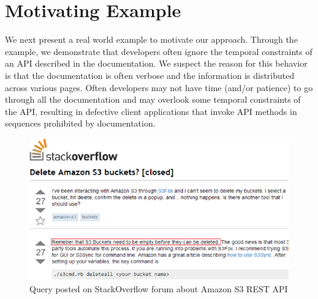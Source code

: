 \section{Motivating Example}
\label{sec:example}

We next present a real world example to motivate our approach.
Through the example, we demonstrate that developers often ignore the temporal constraints of an API described in the documentation.
We suspect the reason for this behavior is that the documentation is often verbose and the information is distributed across various pages.
Often developers may not have time (and/or patience) to go through all the documentation and may overlook some temporal constraints of the API,
resulting in defective client applications that invoke API methods in sequences prohibited by documentation. 

\begin{figure}[t]
	\begin{center}
		\includegraphics[scale=0.45]{Stackoverflow.eps}
	\end{center}
	\vspace*{-3ex}
	\caption{\label{fig:Stackoverflow} Query posted on StackOverflow forum about Amazon S3 REST API}
	\vspace*{-3ex}
\end{figure}


